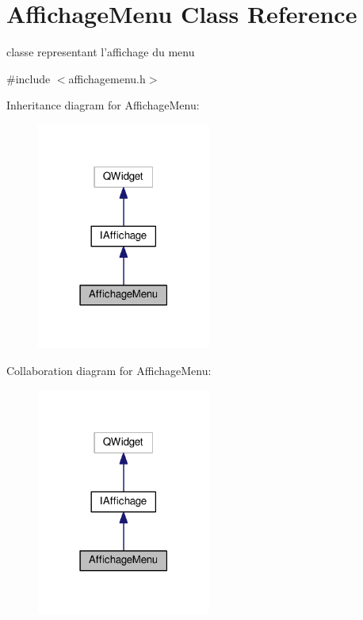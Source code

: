 \hypertarget{classAffichageMenu}{\section{Affichage\+Menu Class Reference}
\label{classAffichageMenu}
}


classe representant l'affichage du menu  




{\ttfamily \#include $<$affichagemenu.\+h$>$}



Inheritance diagram for Affichage\+Menu\+:
\nopagebreak
\begin{figure}[H]
\begin{center}
\leavevmode
\includegraphics[width=162pt]{classAffichageMenu__inherit__graph}
\end{center}
\end{figure}


Collaboration diagram for Affichage\+Menu\+:
\nopagebreak
\begin{figure}[H]
\begin{center}
\leavevmode
\includegraphics[width=162pt]{classAffichageMenu__coll__graph}
\end{center}
\end{figure}
